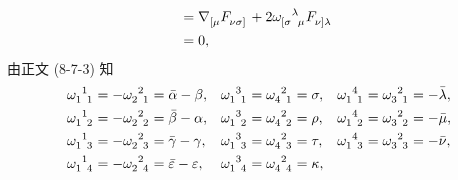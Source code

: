 \begin{xiti}
\begin{jie}
\begin{align*}
			={}& \tensor{\nabla}{_{[\mu}} \tensor{F}{_{\nu \sigma]}} + 2 \tensor{\omega}{_{[\sigma}^\lambda_\mu} \tensor{F}{_{\nu]}_\lambda}\\
			={}& 0,
		\end{align*}
		由正文 (8-7-3) 知
		\begin{align*}
			\tensor{\omega}{_1^1_1} &= - \tensor{\omega}{_2^2_1} = \bar{\alpha} - \beta,
			& \tensor{\omega}{_1^3_1} &= \tensor{\omega}{_4^2_1} = \sigma,
			& \tensor{\omega}{_1^4_1} &= \tensor{\omega}{_3^2_1} = - \bar{\lambda},
			\\
			\tensor{\omega}{_1^1_2} &= - \tensor{\omega}{_2^2_2} = \bar{\beta} - \alpha,
			& \tensor{\omega}{_1^3_2} &= \tensor{\omega}{_4^2_2} = \rho,
			& \tensor{\omega}{_1^4_2} &= \tensor{\omega}{_3^2_2} = - \bar{\mu},
			\\
			\tensor{\omega}{_1^1_3} &= - \tensor{\omega}{_2^2_3} = \bar{\gamma} - \gamma,
			& \tensor{\omega}{_1^3_3} &= \tensor{\omega}{_4^2_3} = \tau,
			& \tensor{\omega}{_1^4_3} &= \tensor{\omega}{_3^2_3} = - \bar{\nu},
			\\
			\tensor{\omega}{_1^1_4} &= - \tensor{\omega}{_2^2_4} = \bar{\varepsilon} - \varepsilon,
			& \tensor{\omega}{_1^3_4} &= \tensor{\omega}{_4^2_4} = \kappa,

\end{align*}
\end{jie}
\end{xiti}
